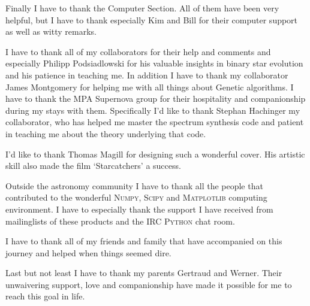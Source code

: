 Finally I have to thank the Computer Section. All of them have been very helpful, but I have to thank especially Kim and Bill for their computer support as well as witty remarks.

I have to thank all of my collaborators for their help and comments and especially Philipp Podsiadlowski for his valuable insights in binary star evolution and his patience in teaching me.
In addition I have to thank my collaborator James Montgomery for helping me with all things about Genetic algorithms.
I have to thank the MPA Supernova group for their hospitality and companionship during my stays with them. Specifically I'd like to thank Stephan Hachinger my collaborator, who has helped me master the spectrum synthesis code and patient in teaching me about the theory underlying that code.

I'd like to thank Thomas Magill for designing such a wonderful cover. His artistic skill also made the film `Starcatchers' a success.

Outside the astronomy community I have to thank all the people that contributed to the wonderful \textsc{Numpy}, \textsc{Scipy} and \textsc{Matplotlib} computing environment. I have to especially thank the support I have received from mailinglists of these products and the IRC \textsc{Python} chat room.

I have to thank all of my friends and family that have accompanied on this journey and helped when things seemed dire.

Last but not least I have to thank my parents Gertraud and Werner. Their unwaivering support, love and companionship have made it possible for me to reach this goal in life. 


